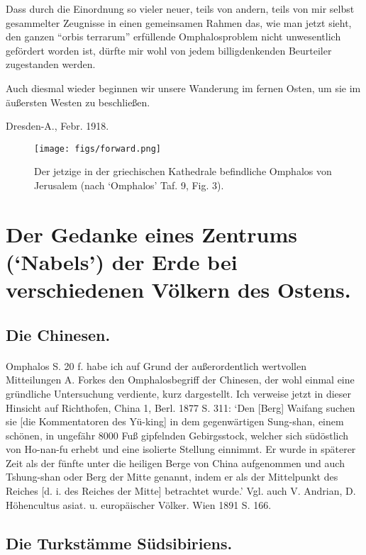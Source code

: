 \documentclass[a4paper, 11pt, oneside]{article}
\begin{document}
Dass durch die Einordnung so vieler neuer, teils von andern, teils von mir selbst gesammelter Zeugnisse in einen gemeinsamen Rahmen das, wie man jetzt sieht, den ganzen "`orbis terrarum"' erfüllende Omphalosproblem nicht unwesentlich gefördert worden ist, dürfte mir wohl von jedem billigdenkenden Beurteiler zugestanden werden.

Auch diesmal wieder beginnen wir unsere Wanderung im fernen Osten, um sie im äußersten Westen zu beschließen.

Dresden-A., Febr. 1918.
\clearpage
\vspace*{\fill}
\begin{figure}[H]
\centering
\texttt{[image: figs/forward.png]}
\caption*{Der jetzige in der griechischen Kathedrale befindliche Omphalos von Jerusalem (nach `Omphalos' Taf. 9, Fig. 3).}
\end{figure}
\vspace*{\fill}
\clearpage
\section{Der Gedanke eines Zentrums (`Nabels') der Erde bei verschiedenen Völkern des Ostens.}
\subsection{Die Chinesen.}
\paragraph{}
Omphalos S. 20 f. habe ich auf Grund der außerordentlich wertvollen Mitteilungen A. Forkes den Omphalosbegriff der Chinesen, der wohl einmal eine gründliche Untersuchung verdiente, kurz dargestellt. Ich verweise jetzt in dieser Hinsicht auf Richthofen, China 1, Berl. 1877 S. 311: `Den [Berg] Waifang suchen sie [die Kommentatoren des Yü-king] in dem gegenwärtigen Sung-shan, einem schönen, in ungefähr 8000 Fuß gipfelnden Gebirgsstock, welcher sich südöstlich von Ho-nan-fu erhebt und eine isolierte Stellung einnimmt. Er wurde in späterer Zeit als der fünfte unter die heiligen Berge von China aufgenommen und auch Tshung-shan oder Berg der Mitte genannt, indem er als der Mittelpunkt des Reiches [d. i. des Reiches der Mitte] betrachtet wurde.' Vgl. auch V. Andrian, D. Höhencultus asiat. u. europäischer Völker. Wien 1891 S. 166.

\subsection{Die Turkstämme Südsibiriens.}
\end{document}

